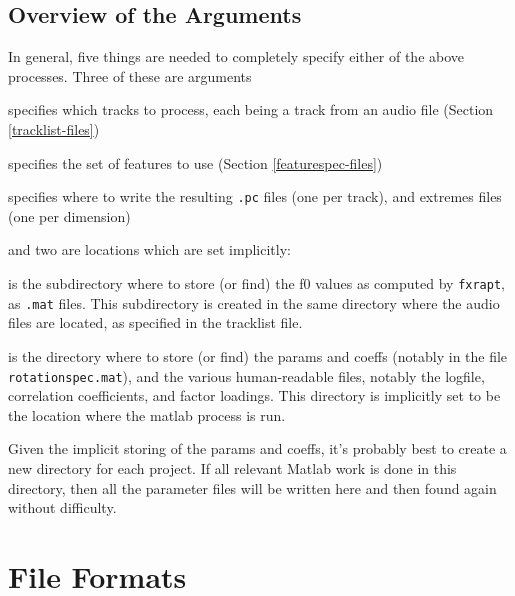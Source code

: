 \documentclass[11pt]{article}
\begin{document}
\subsection{Overview of the Arguments}   \label{arguments}

In general,  five things are  needed to completely specify either
of the above processes.  Three of these are arguments

\begin{description}  \setlength{\itemsep}{0pt}\setlength{\parskip}{0pt}
\item[tracklist] specifies which tracks to process, each being a
  track from an audio file (Section \ref{tracklist-files})
\item[featurespec file]  specifies the set of features to use (Section \ref{featurespec-files})
\item[output dir] specifies where to write the resulting {\tt .pc}
  files (one per track), and extremes files (one per dimension)
\end{description}

and two  are locations which are set implicitly:

\begin{description}  \setlength{\itemsep}{0pt}\setlength{\parskip}{0pt}
\item[pitch cache] is the subdirectory where to store (or find) the f0
  values as computed by {\tt fxrapt}, as {\tt .mat} files.  This
  subdirectory is created in the same directory where the audio files
  are located, as specified in the tracklist file.
\item[parameter dir] is the directory where to store (or find) the
  params and coeffs (notably in the file {\tt rotationspec.mat}), and
  the various human-readable files, notably the logfile, correlation
  coefficients, and factor loadings.  This directory is implicitly set
  to be the location where the matlab process is run.
\end{description}

Given the implicit storing of the params and coeffs, it's probably
best to create a new directory for each project.  If all relevant
Matlab work is done in this directory, then all the parameter files
will be written here and then found again without difficulty.


\section{File Formats}        \label{sec:file-formats}
\end{document}
